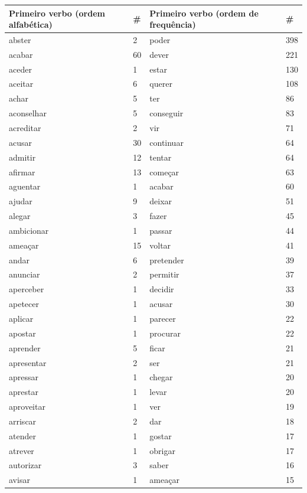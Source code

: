 \documentclass[output=paper,colorlinks,citecolor=brown]{langscibook}
\begin{document}
	\begin{longtable}{ p{3cm} | p{1cm} | p{3cm} | p{1cm} }
		\hline
		\textbf{Primeiro verbo (ordem alfabética)} & \textbf{\#} & \textbf{Primeiro verbo (ordem de frequência)} & \textbf{\#} \\\hline
		abster & 2 & poder & 398\\\hline
		acabar & 60 & dever & 221\\\hline
		aceder & 1 & estar & 130\\\hline
		aceitar & 6 & querer & 108\\\hline
		achar & 5 & ter & 86\\\hline
		aconselhar & 5 & conseguir & 83\\\hline
		acreditar & 2 & vir & 71\\\hline
		acusar & 30 & continuar & 64\\\hline
		admitir & 12 & tentar & 64\\\hline
		afirmar & 13 & começar & 63\\\hline
		aguentar & 1 & acabar & 60\\\hline
		ajudar & 9 & deixar & 51\\\hline
		alegar & 3 & fazer & 45\\\hline
		ambicionar & 1 & passar & 44\\\hline
		ameaçar & 15 & voltar & 41\\\hline
		andar & 6 & pretender & 39\\\hline
		anunciar & 2 & permitir & 37\\\hline
		aperceber & 1 & decidir & 33\\\hline
		apetecer & 1 & acusar & 30\\\hline
		aplicar & 1 & parecer & 22\\\hline
		apostar & 1 & procurar & 22\\\hline
		aprender & 5 & ficar & 21\\\hline
		apresentar & 2 & ser & 21\\\hline
		apressar & 1 & chegar & 20\\\hline
		aprestar & 1 & levar & 20\\\hline
		aproveitar & 1 & ver & 19\\\hline
		arriscar & 2 & dar & 18\\\hline
		atender & 1 & gostar & 17\\\hline
		atrever & 1 & obrigar & 17\\\hline
		autorizar & 3 & saber & 16\\\hline
		avisar & 1 & ameaçar & 15\\\hline

\end{longtable}
\end{document}
